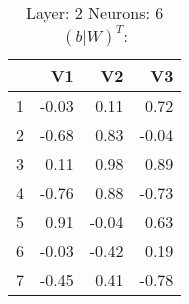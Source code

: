 \begin{table}[ht]
\centering
\begin{tabular}{rrrr}
  \hline
 & V1 & V2 & V3 \\ 
  \hline
1 & -0.03 & 0.11 & 0.72 \\ 
  2 & -0.68 & 0.83 & -0.04 \\ 
  3 & 0.11 & 0.98 & 0.89 \\ 
  4 & -0.76 & 0.88 & -0.73 \\ 
  5 & 0.91 & -0.04 & 0.63 \\ 
  6 & -0.03 & -0.42 & 0.19 \\ 
  7 & -0.45 & 0.41 & -0.78 \\ 
   \hline
\end{tabular}
\caption{Layer: 2 Neurons: 6  $(b|W)^T$: 
} 
\end{table}
